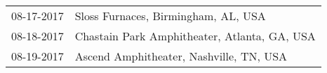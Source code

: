 \begin{supertabular}{ll}
 08-17-2017 &           Sloss Furnaces, Birmingham, AL, USA \\
 08-18-2017 &  Chastain Park Amphitheater, Atlanta, GA, USA \\
 08-19-2017 &       Ascend Amphitheater, Nashville, TN, USA \\
\end{supertabular}
